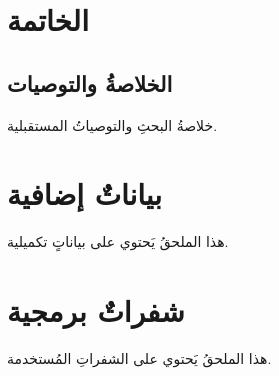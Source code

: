 \documentclass[12pt, a4paper]{book}
\begin{document}
\chapter{الخاتمة}
\section{الخلاصةُ والتوصيات}
خلاصةُ البحثِ والتوصياتُ المستقبلية.

\appendix

\chapter{بياناتٌ إضافية}
هذا الملحقُ يَحتوي على بياناتٍ تكميلية.

\chapter{شفراتٌ برمجية}
هذا الملحقُ يَحتوي على الشفراتِ المُستخدمة.

\backmatter

\printbibliography
\printindex
\end{document}
